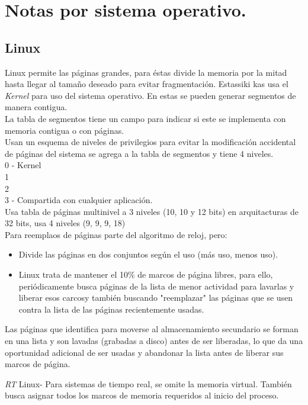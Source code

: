 \section{Notas por sistema operativo.}
\subsection{Linux}
Linux permite las p\'{a}ginas grandes, para \'{e}stas divide la memoria por la mitad hasta llegar al tama\~{n}o deseado para evitar fragmentaci\'{o}n. Estassiki kas usa el \textit{Kernel} para uso del sistema operativo. En estas se pueden generar segmentos de manera contigua.\\
La tabla de segmentos tiene un campo para indicar si este se implementa con memoria contigua o con p\'{a}ginas.\\
Usan un esquema de niveles de privilegios para evitar la modificaci\'{o}n accidental de p\'{a}ginas del sistema se agrega a la tabla de segmentos y tiene 4 niveles.\\
0 - Kernel\\
1\\
2\\
3 - Compartida con cualquier aplicaci\'{o}n.\\
Usa tabla de p\'{a}ginas multinivel a 3 niveles (10, 10 y 12 bits) en arquitacturas de 32 bits, usa 4 niveles (9, 9, 9, 18)\\
Para reemplaos de p\'{a}ginas parte del algoritmo de reloj, pero:\\
\begin{itemize}
	\item Divide las p\'{a}ginas en dos conjuntos seg\'{u}n el uso (m\'{a}s uso, menos uso).
	\item Linux trata de mantener el 10\% de marcos de p\'{a}gina libres, para ello, peri\'{o}dicamente busca p\'{a}ginas de la lista de menor actividad para lavarlas y liberar esos carcosy tambi\'{e}n buscando "reemplazar" las p\'{a}ginas que se usen contra la lista de las p\'{a}ginas recientemente usadas.\\
\end{itemize}
Las p\'{a}ginas que identifica para moverse al almacenamiento secundario se forman en una lista y son lavadas (grabadas a disco) antes de ser liberadas, lo que da una oportunidad adicional de ser usadas y abandonar la lista antes de liberar sus marcos de p\'{a}gina.

\textit{RT} Linux- Para sistemas de tiempo real, se omite la memoria virtual. Tambi\'{e}n busca asignar todos los marcos de memoria requeridos al inicio del proceso.

